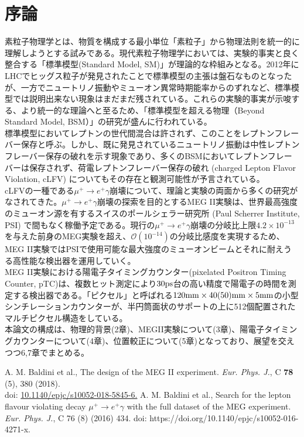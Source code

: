 \documentclass[Yonemoto_master.tex]{subfiles}
\begin{document}
\chapter{序論}

素粒子物理学とは、物質を構成する最小単位「素粒子」から物理法則を統一的に理解しようとする試みである。現代素粒子物理学においては、実験的事実と良く整合する「標準模型(Standard Model, SM)」が理論的な枠組みとなる。2012年にLHCでヒッグス粒子が発見されたことで標準模型の主張は盤石なものとなったが、一方でニュートリノ振動やミューオン異常時期能率からのずれなど、標準模型では説明出来ない現象はまだまだ残されている。これらの実験的事実が示唆する、より統一的な理論へと至るため、「標準模型を超える物理（Beyond Standard Model, BSM）」の研究が盛んに行われている。\\

標準模型においてレプトンの世代間混合は許されず、このことをレプトンフレーバー保存と呼ぶ。しかし、既に発見されているニュートリノ振動は中性レプトンフレーバー保存の破れを示す現象であり、多くのBSMにおいてレプトンフレーバーは保存されず、荷電レプトンフレーバー保存の破れ (charged Lepton Flavor Violation, cLFV) についてもその存在と観測可能性が予言されている。\\


cLFVの一種である$\mu^+ \to e^+\gamma$崩壊について、理論と実験の両面から多くの研究がなされてきた。$\mu^+ \to e^+\gamma$崩壊の探索を目的とするMEG II実験\cite{MEGII}は、世界最高強度のミューオン源を有するスイスのポールシェラー研究所 (Paul Scherrer Institute, PSI) で間もなく稼働予定である。現行の$\mu^+ \to e^+\gamma$崩壊の分岐比上限$4.2 \times 10^{-13}$を与えた前身のMEG実験\cite{MEG}を超え、$\mathcal{O}(10^{-14})$の分岐比感度を実現するため、MEG II実験ではPSIで使用可能な最大強度のミューオンビームとそれに耐えうる高性能な検出器を運用していく。\\


MEG II実験における陽電子タイミングカウンター(pixelated Positron Timing Counter, pTC)は、複数ヒット測定により$ 30 \rm ps$台の高い精度で陽電子の時間を測定する検出器である。「ピクセル」と呼ばれる$120 {\rm mm} \times 40 (50){\rm mm} \times 5 {\rm mm}$の小型シンチレーションカウンターが、半円筒面状のサポートの上に512個配置されたマルチピクセル構造をしている。\\


本論文の構成は、物理的背景(2章)、MEGII実験について(3章)、陽電子タイミングカウンターについて(4章)、位置較正について(5章)となっており、展望を交えつつ6,7章でまとめる。

{ }{
\begin{thebibliography}{99}
 A. M. Baldini et al., The design of the MEG II experiment. {\it Eur. Phys. J.}, C {\bf 78} (5), 380 (2018). \\ 
doi: \href{https://doi.org/10.1140/epjc/s10052-018-5845-6}{10.1140/epjc/s10052-018-5845-6.}
 A. M. Baldini et al., Search for the lepton flavour violating decay $\mu^+ \to e^+ \gamma$ with the full dataset of the MEG experiment. {\it Eur. Phys. J.}, C 76 (8) (2016) 434. 
doi: https://doi.org/10.1140/epjc/s10052-016-4271-x. 
\end{thebibliography}
}
\end{document}

